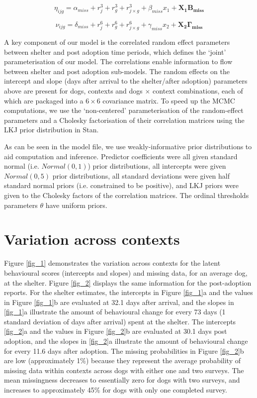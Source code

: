 \documentclass[12pt]{article}
\begin{document}
\begin{equation}
  \eta_{ijg} = \alpha_{miss} + r_{j}^{3} + r_{g}^{3} + r_{j \times g}^{3} +
               \beta_{miss} x_{1} + \mathbf{X_{1}} \mathbf{B_{miss}}
\end{equation}

\begin{equation}
  \nu_{ijg} = \delta_{miss} + r_{j}^{6} + r_{g}^{6} + r_{j \times g}^{6} +
               \gamma_{miss} x_{2} + \mathbf{X_{2}} \mathbf{\Gamma_{miss}}
\end{equation}

A key component of our model is the correlated random effect parameters between shelter and post adoption time periods, which defines the `joint' parameterisation of our model. The correlations enable information to flow between shelter and post adoption sub-models. The random effects on the intercept and slope (days after arrival to the shelter/after adoption) parameters above are present for dogs, contexts and dogs $\times$ context combinations, each of which are packaged into a $6 \times 6$ covariance matrix. To speed up the MCMC computations, we use the `non-centered' parameterisation of the random-effect parameters and a Cholesky factorisation of their correlation matrices using the LKJ prior distribution in Stan.

As can be seen in the model file, we use weakly-informative prior distributions to aid computation and inference. Predictor coefficients were all given standard normal (i.e. $Normal(0, 1)$) prior distributions, all intercepts were given $Normal(0, 5)$ prior distributions, all standard deviations were given half standard normal priors (i.e. constrained to be positive), and LKJ priors were given to the Cholesky factors of the correlation matrices. The ordinal thresholds parameters $\theta$ have uniform priors.

\newpage
\section{Variation across contexts}
Figure \ref{fig_1} demonstrates the variation across contexts for the latent behavioural scores (intercepts and slopes) and missing data, for an average dog, at the shelter. Figure \ref{fig_2} displays the same information for the post-adoption reports. For the shelter estimates, the intercepts in Figure \ref{fig_1}a and the values in Figure \ref{fig_1}b are evaluated at 32.1 days after arrival, and the slopes in \ref{fig_1}a illustrate the amount of behavioural change for every 73 days (1 standard deviation of days after arrival) spent at the shelter. The intercepts \ref{fig_2}a and the values in Figure \ref{fig_2}b are evaluated at 30.1 days post adoption, and the slopes in \ref{fig_2}a illustrate the amount of behavioural change for every 11.6 days after adoption. The missing probabilities in Figure \ref{fig_2}b are low (approximately 1\%) because they represent the average probability of missing data within contexts across dogs with either one and two surveys. The mean missingness decreases to essentially zero for dogs with two surveys, and increases to approximately 45\% for dogs with only one completed survey.
\end{document}
